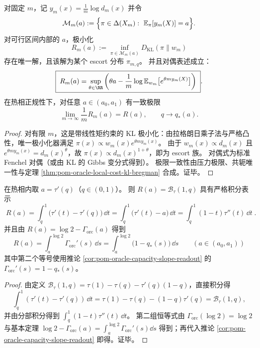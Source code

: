 \begin{theorem}\label{thm:pom-oracle-i-projection-escort}
对固定 \(m\)，记 \(y_m(x)=\frac{1}{m}\log d_m(x)\) 并令
\[
\mathcal{M}_m(a):=\Bigl\{\pi\in\Delta(X_m):\ \mathbb{E}_{\pi}[y_m(X)]=a\Bigr\}.
\]
对可行区间内部的 \(a\)，极小化
\[
R_m(a):=\inf_{\pi\in\mathcal{M}_m(a)}D_{\mathrm{KL}}(\pi\|w_m)
\]
存在唯一解，且该解为某个 escort 分布 \(\pi_{m,q}\)。
并且对偶表述成立：
\[
\boxed{\;
R_m(a)=\sup_{\theta\in\RR}\left(\theta a-\frac{1}{m}\log \mathbb{E}_{w_m}\bigl[e^{\theta m y_m(X)}\bigr]\right)\; }.
\]
在热相正规性下，对任意 \(a\in(a_0,a_1)\) 有一致极限
\[
\lim_{m\to\infty}\frac{1}{m}R_m(a)=R(a),
\qquad
q\to q_*(a).
\]
\end{theorem}
\begin{proof}
对有限 \(m\)，这是带线性矩约束的 KL 极小化：由拉格朗日乘子法与严格凸性，唯一极小化器满足
\(
\pi(x)\propto w_m(x)e^{\theta m y_m(x)}
\)。
由于 \(w_m(x)\propto d_m(x)\) 且 \(e^{\theta m y_m(x)}=d_m(x)^{\theta}\)，故 \(\pi(x)\propto d_m(x)^{1+\theta}\)，即为 escort 族。
对偶式为标准 Fenchel 对偶（或由 KL 的 Gibbs 变分式得到）。
极限一致性由压力极限、共轭唯一性与定理 \ref{thm:pom-oracle-local-cost-kl-bregman} 合成。证毕。
\end{proof}

\begin{theorem}\label{thm:pom-oracle-local-cost-area-representation}
在热相内取 \(a=\tau'(q)\)（\(q\in(0,1)\)）。
则 \(R(a)=\mathcal{B}_{\tau}(1,q)\) 具有严格积分表示
\[
\boxed{\;
R(a)=\int_{q}^{1}\bigl(\tau'(t)-\tau'(q)\bigr)\,\dd t
=\int_{q}^{1}\bigl(\tau'(t)-a\bigr)\,\dd t
=\int_{q}^{1}(1-t)\tau''(t)\,\dd t\; }.
\]
并且由 \(R(a)=\log 2-\Gamma_{\mathrm{orc}}(a)\) 得到
\[
\boxed{\;
R(a)=\int_{a}^{\log 2}\Gamma_{\mathrm{orc}}'(s)\,\dd s
=\int_{a}^{\log 2}\bigl(1-q_*(s)\bigr)\,\dd s\qquad (a\in(a_0,a_1))\;}
\]
其中第二个等号使用推论 \ref{cor:pom-oracle-capacity-slope-readout} 的 \(\Gamma_{\mathrm{orc}}'(s)=1-q_*(s)\)。
\end{theorem}
\begin{proof}
由定义 \(\mathcal{B}_{\tau}(1,q)=\tau(1)-\tau(q)-\tau'(q)(1-q)\)，直接积分得
\[
\int_q^1(\tau'(t)-\tau'(q))\,\dd t=\tau(1)-\tau(q)-(1-q)\tau'(q)=\mathcal{B}_{\tau}(1,q),
\]
并由分部积分得到 \(\int_q^1(1-t)\tau''(t)\,\dd t\)。
第二组恒等式由 \(\Gamma_{\mathrm{orc}}(\log 2)=\log 2\) 与基本定理
\(
\log 2-\Gamma_{\mathrm{orc}}(a)=\int_a^{\log 2}\Gamma_{\mathrm{orc}}'(s)\dd s
\)
得到；再代入推论 \ref{cor:pom-oracle-capacity-slope-readout} 即得。证毕。
\end{proof}

\endinput
